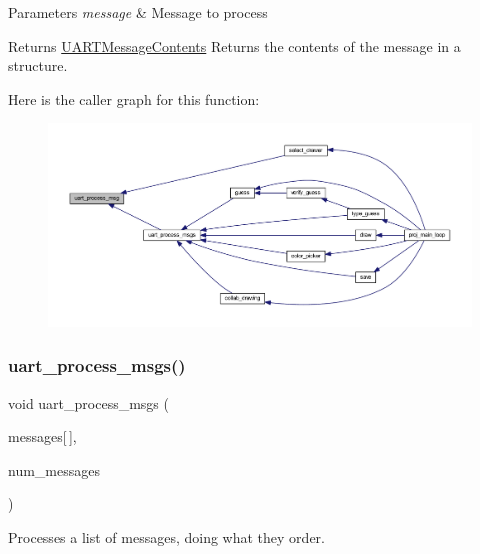 \begin{DoxyParams}{Parameters}
{\em message} & Message to process \\
\hline
\end{DoxyParams}
\begin{DoxyReturn}{Returns}
\mbox{\hyperlink{struct_u_a_r_t_message_contents}{U\+A\+R\+T\+Message\+Contents}} Returns the contents of the message in a structure. 
\end{DoxyReturn}
Here is the caller graph for this function\+:\nopagebreak
\begin{figure}[H]
\begin{center}
\leavevmode
\includegraphics[width=350pt]{group__uart__wordgame_gaa1fdee09f3f9af28335a782b49fafffe_icgraph}
\end{center}
\end{figure}
\mbox{\label{group__uart__wordgame_ga1dbbd888f62428123dfc5bbbfa178134}} 
\subsubsection{\texorpdfstring{uart\+\_\+process\+\_\+msgs()}{uart\_process\_msgs()}}
{\footnotesize\ttfamily void uart\+\_\+process\+\_\+msgs (\begin{DoxyParamCaption}\item[{\mbox{\hyperlink{struct_u_a_r_t_message}{U\+A\+R\+T\+Message}}}]{messages\mbox{[}$\,$\mbox{]},  }\item[{uint16\+\_\+t}]{num\+\_\+messages }\end{DoxyParamCaption})}



Processes a list of messages, doing what they order. 


